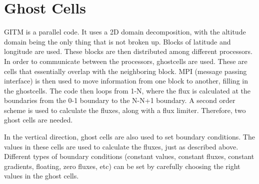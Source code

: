 \section{Ghost Cells}

GITM is a parallel code.  It uses a 2D domain decomposition, with the
altitude domain being the only thing that is not broken up.  Blocks of
latitude and longitude are used.  These blocks are then distributed
among different processors.  In order to communicate between the
processors, ghostcells are used.  These are cells that essentially
overlap with the neighboring block.  MPI (message passing interface)
is then used to move information from one block to another, filling in
the ghostcells.  The code then loops from 1-N, where the flux is
calculated at the boundaries from the 0-1 boundary to the N-N+1
boundary.  A second order scheme is used to calculate the fluxes,
along with a flux limiter.  Therefore, two ghost cells are needed.

In the vertical direction, ghost cells are also used to set boundary
conditions.  The values in these cells are used to calculate the
fluxes, just as described above.  Different types of boundary
conditions (constant values, constant fluxes, constant gradients,
floating, zero fluxes, etc) can be set by carefully choosing the right
values in the ghost cells.


